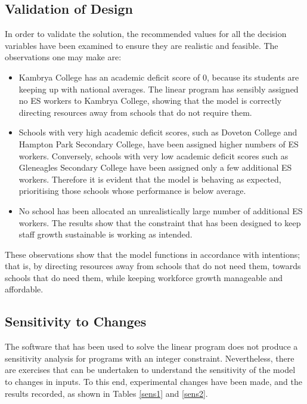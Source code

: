 \documentclass[11pt, a4paper]{article}
\begin{document}
    \subsection{Validation of Design}

    In order to validate the solution, the recommended values for all the decision variables have been examined to ensure they are realistic and feasible. The observations one may make are:
    
    \begin{itemize}
        \item Kambrya College has an academic deficit score of 0, because its students are keeping up with national averages. The linear program has sensibly assigned no ES workers to Kambrya College, showing that the model is correctly directing resources away from schools that do not require them.
        \item Schools with very high academic deficit scores, such as Doveton College and Hampton Park Secondary College, have been assigned higher numbers of ES workers. Conversely, schools with very low academic deficit scores such as Gleneagles Secondary College have been assigned only a few additional ES workers. Therefore it is evident that the model is behaving as expected, prioritising those schools whose performance is below average.
        \item No school has been allocated an unrealistically large number of additional ES workers. The results show that the constraint that has been designed to keep staff growth sustainable is working as intended.
    \end{itemize}

    These observations show that the model functions in accordance with intentions; that is, by directing resources away from schools that do not need them, towards schools that do need them, while keeping workforce growth manageable and affordable.

    \subsection{Sensitivity to Changes}    
    
    The software that has been used to solve the linear program does not produce a sensitivity analysis for programs with an integer constraint. Nevertheless, there are exercises that can be undertaken to understand the sensitivity of the model to changes in inputs. To this end, experimental changes have been made, and the results recorded, as shown in Tables \ref{sens1} and \ref{sens2}.
\end{document}

